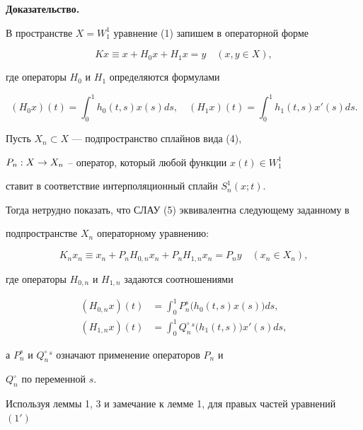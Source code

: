 {\bf Доказательство.}


В пространстве $X=W_1^1$ уравнение (1) запишем в операторной форме


\begin{equation}


Kx\equiv x+H_0x+H_1x=y\quad (x,y\in X),\tag{$1'$}


\end{equation}


где операторы $H_0$ и $H_1$ определяются формулами


$$


(H_0x)(t)=\int_0^1h_0(t,s)x(s) ds,\quad


(H_1x)(t)=\int_0^1h_1(t,s)x'(s) ds.


$$





Пусть $X_n\subset X$ --- подпространство сплайнов вида (4),


$P_n:X \to X_n$ -- оператор, который любой функции $x(t)\in W_1^1$


ставит в соответствие интерполяционный сплайн $S_n^1(x;t)$.


Тогда нетрудно показать, что СЛАУ (5) эквивалентна следующему заданному в


подпространстве $X_n$ операторному уравнению:


\begin{equation}


K_nx_n\equiv x_n+P_nH_{0,n}x_n+P_nH_{1,n}x_n=P_ny\quad (x_n\in X_n),


\end{equation}


где операторы $H_{0,n}$ и $H_{1,n}$ задаются соотношениями


\begin{align*}


(H_{0,n}x)(t)&=\int_0^1P_n^s\big(h_0(t,s)x(s)\big)ds,\\


%


(H_{1,n}x)(t)&=\int_0^1 Q_n^\circ{}^s\big(h_1(t,s)\big)x'(s) ds,


\end{align*}


а $P_n^s$ и $Q_n^\circ{}^s$ означают применение операторов $P_n$ и


$Q_n^\circ$ по переменной $s$.





Используя леммы 1, 3 и замечание к лемме 1, для правых частей уравнений $(1')$


